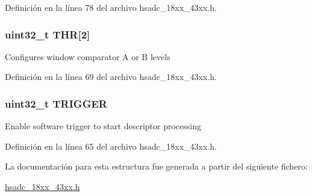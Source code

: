 Definición en la línea 78 del archivo hsadc\+\_\+18xx\+\_\+43xx.\+h.

\subsubsection[{\texorpdfstring{T\+HR}{THR}}]{ uint32\+\_\+t T\+HR\mbox{[}2\mbox{]}}\hypertarget{struct_l_p_c___h_s_a_d_c___t_aa7c4455d20587c36347ecc9290ce8156}{}\label{struct_l_p_c___h_s_a_d_c___t_aa7c4455d20587c36347ecc9290ce8156}
Configures window comparator A or B levels 

Definición en la línea 69 del archivo hsadc\+\_\+18xx\+\_\+43xx.\+h.

\subsubsection[{\texorpdfstring{T\+R\+I\+G\+G\+ER}{TRIGGER}}]{ uint32\+\_\+t T\+R\+I\+G\+G\+ER}\hypertarget{struct_l_p_c___h_s_a_d_c___t_a5d002b61de3373d6bec5da6bc4ad4bcc}{}\label{struct_l_p_c___h_s_a_d_c___t_a5d002b61de3373d6bec5da6bc4ad4bcc}
Enable software trigger to start descriptor processing 

Definición en la línea 65 del archivo hsadc\+\_\+18xx\+\_\+43xx.\+h.



La documentación para esta estructura fue generada a partir del siguiente fichero\+:\begin{DoxyCompactItemize}
\item 
\hyperlink{hsadc__18xx__43xx_8h}{hsadc\+\_\+18xx\+\_\+43xx.\+h}\end{DoxyCompactItemize}
